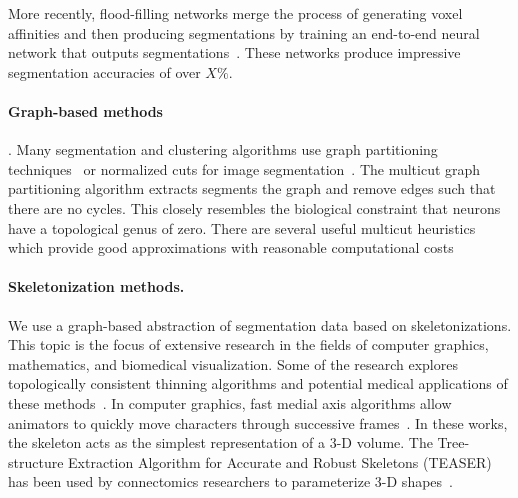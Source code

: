 More recently, flood-filling networks merge the process of generating voxel affinities and then producing segmentations by training an end-to-end neural network that outputs segmentations~\cite{januszewski2016flood}. 
These networks produce impressive segmentation accuracies of over $X\%$.%

\paragraph{Graph-based methods}. Many segmentation and clustering algorithms use graph partitioning techniques~\cite{andres2012globally} or normalized cuts for image segmentation~\cite{kappes2016higher,shi2000normalized,tatiraju2008image}. 
The multicut graph partitioning algorithm extracts segments the graph and remove edges such that there are no cycles. 
This closely resembles the biological constraint that neurons have a topological genus of zero. 
There are several useful multicut heuristics which provide good approximations with reasonable computational costs~\cite{horvnakova2017analysis,kernighan1970efficient,keuper2015efficient}

\paragraph{Skeletonization methods.} We use a graph-based abstraction of segmentation data based on skeletonizations. 
This topic is the focus of extensive research in the fields of computer graphics, mathematics, and biomedical visualization.
Some of the research explores topologically consistent thinning algorithms and potential medical applications of these methods~\cite{palagyi20003d,palagyi2001sequential}. 
In computer graphics, fast medial axis algorithms allow animators to quickly move characters through successive frames~\cite{baran2007automatic,bharaj2012automatically}. 
In these works, the skeleton acts as the simplest representation of a 3-D volume. 
The Tree-structure Extraction Algorithm for Accurate and Robust Skeletons (TEASER) has been used by connectomics researchers to parameterize 3-D shapes~\cite{sato2000teasar,zhao2014automatic}. 


